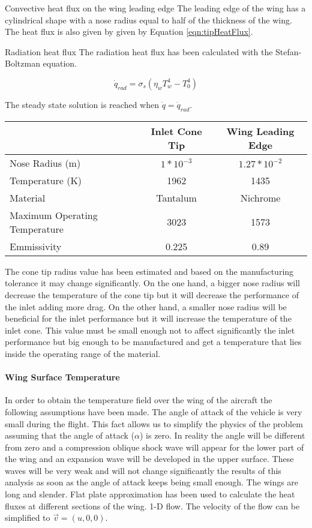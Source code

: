 Convective heat flux on the wing leading edge
The leading edge of the wing has a cylindrical shape with a nose radius equal to half of the thickness of the wing. The heat flux is also given by given by Equation \ref{eqn:tipHeatFlux}.

Radiation heat flux
The radiation heat flux has been calculated with the Stefan-Boltzman equation.

\begin{equation}
\dot{q}_{rad}=\sigma_s (\eta_w T_w^4-T_0^4)
\end{equation}

The steady state solution is reached when $\dot{q}=\dot{q}_{rad}$.

\begin{center}
\begin{tabular}{l c c}
& Inlet Cone Tip & Wing Leading Edge \\
\hline
Nose Radius (m) & $1*10^{-3}$ & $1.27 * 10^{-2}$ \\
Temperature (K) & 1962 & 1435 \\
Material & Tantalum & Nichrome \\
Maximum Operating Temperature & 3023 & 1573 \\
Emmissivity & 0.225 & 0.89
\end{tabular}
\end{center}

The cone tip radius value has been estimated and based on the manufacturing tolerance it may change significantly. On the one hand, a bigger nose radius will decrease the temperature of the cone tip but it will decrease the performance of the inlet adding more drag. On the other hand, a smaller nose radius will be beneficial for the inlet performance but it will increase the temperature of the inlet cone. This value must be small enough not to affect significantly the inlet performance but big enough to be manufactured and get a temperature that lies inside the operating range of the material.

\paragraph{Wing Surface Temperature}
In order to obtain the temperature field over the wing of the aircraft the following assumptions have been made.
	The angle of attack of the vehicle is very small during the flight. This fact allows us to simplify the physics of the problem assuming that the angle of attack ($\alpha$) is zero. In reality the angle will be different from zero and a compression oblique shock wave will appear for the lower part of the wing and an expansion wave will be developed in the upper surface. These waves will be very weak and will not change significantly the results of this analysis as soon as the angle of attack keeps being small enough.
	The wings are long and slender. Flat plate approximation has been used to calculate the heat fluxes at different sections of the wing.
	1-D flow. The velocity of the flow can be simplified to $\overrightarrow{v}=(u,0,0)$.
	
